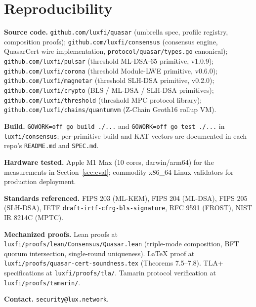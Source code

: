 \documentclass[11pt,a4paper]{article}
\begin{document}



\appendix
\section*{Reproducibility}
\textbf{Source code.}
\texttt{github.com/luxfi/quasar} (umbrella spec, profile registry,
composition proofs);
\texttt{github.com/luxfi/consensus} (consensus engine, QuasarCert wire
implementation, \texttt{protocol/quasar/types.go} canonical);
\texttt{github.com/luxfi/pulsar} (threshold ML-DSA-65 primitive,
v1.0.9);
\texttt{github.com/luxfi/corona} (threshold Module-LWE primitive, v0.6.0);
\texttt{github.com/luxfi/magnetar} (threshold SLH-DSA primitive,
v0.2.0);
\texttt{github.com/luxfi/crypto} (BLS / ML-DSA / SLH-DSA primitives);
\texttt{github.com/luxfi/threshold} (threshold MPC protocol library);
\texttt{github.com/luxfi/chains/quantumvm} (Z-Chain Groth16 rollup VM).

\noindent\textbf{Build.}
\texttt{GOWORK=off go build ./...} and
\texttt{GOWORK=off go test ./...} in
\texttt{luxfi/consensus}; per-primitive build and KAT vectors are
documented in each repo's \texttt{README.md} and \texttt{SPEC.md}.

\noindent\textbf{Hardware tested.}
Apple M1 Max (10 cores, darwin/arm64) for the measurements in
Section~\ref{sec:eval}; commodity x86\_64 Linux validators
for production deployment.

\noindent\textbf{Standards referenced.}
FIPS 203 (ML-KEM), FIPS 204 (ML-DSA), FIPS 205 (SLH-DSA),
IETF \texttt{draft-irtf-cfrg-bls-signature}, RFC 9591 (FROST),
NIST IR 8214C (MPTC).

\noindent\textbf{Mechanized proofs.}
Lean proofs at \texttt{luxfi/proofs/lean/Consensus/Quasar.lean}
(triple-mode composition, BFT quorum intersection, single-round
uniqueness). LaTeX proof at
\texttt{luxfi/proofs/quasar-cert-soundness.tex}
(Theorems 7.5--7.8). TLA+ specifications at
\texttt{luxfi/proofs/tla/}. Tamarin protocol verification at
\texttt{luxfi/proofs/tamarin/}.

\noindent\textbf{Contact.}
\texttt{security@lux.network}.
\end{document}
